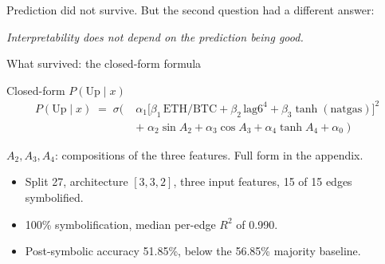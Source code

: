 \documentclass[aspectratio=169, t]{beamer}
\begin{document}
\begin{frame}[c]{}
\centering
\vspace*{1.2cm}

{\large Prediction did not survive. But the second question had a different answer:}

\vspace{1.2em}


\vspace{1.4em}

{\footnotesize\itshape Interpretability does not depend on the prediction being good.}

\end{frame}

\begin{frame}{What survived: the closed-form formula}
\vspace{-0.4em}

{
\begin{block}{Closed-form $P(\mathrm{Up} \mid x)$}
\centering
\vspace{-0.4em}
\[
\begin{aligned}
P(\mathrm{Up} \mid x) \;=\; \sigma\Big(\; & \alpha_1 \big[\beta_1\,\text{ETH/BTC} + \beta_2\,\text{lag6}^4 + \beta_3 \tanh(\text{natgas})\big]^2 \\
& +\; \alpha_2 \sin A_2 + \alpha_3 \cos A_3 + \alpha_4 \tanh A_4 + \alpha_0 \;\Big)
\end{aligned}
\]
\vspace{-1.0em}

{\scriptsize $A_2, A_3, A_4$: compositions of the three features. Full form in the appendix.}
\end{block}
}

\vspace{1.0em}

\begin{itemize}\footnotesize\setlength{\itemsep}{5pt}
  \item Split 27, architecture $[3,3,2]$, three input features, 15 of 15 edges symbolified.
  \item 100\% symbolification, median per-edge $R^2$ of 0.990.
  \item Post-symbolic accuracy 51.85\%, below the 56.85\% majority baseline.
\end{itemize}

\end{frame}
\end{document}
